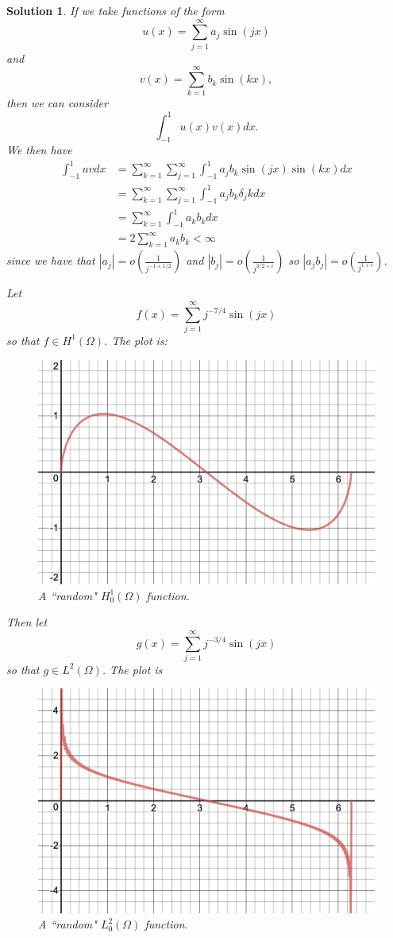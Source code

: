 \documentclass[leqno]{article}
\theoremstyle{nonumberplain}
\newtheorem{solution}{Solution}
\begin{document}
\begin{solution}
If we take functions of the form
\[
u(x) = \sum_{j=1}^\infty a_j \sin(jx)
\]
and
\[
v(x) = \sum_{k=1}^\infty b_k \sin(kx),
\]
then we can consider
\[
\int_{-1}^1 u(x)v(x)dx.
\]
We then have
\begin{align*}
    \int_{-1}^1 uv dx &= \sum_{k=1}^\infty \sum_{j=1}^\infty \int_{-1}^1 a_j b_k \sin(jx)\sin(kx)dx\\
    &= \sum_{k=1}^\infty \sum_{j=1}^\infty \int_{-1}^1a_jb_k \delta_jk dx\\
    &= \sum_{k=1}^\infty \int_{-1}^1 a_kb_k dx\\
    &= 2\sum_{k=1}^\infty a_kb_k<\infty
\end{align*}
since we have that $|a_j|=o\left(\frac{1}{j^{-1+1/2}}\right)$ and $|b_j|=o\left(\frac{1}{j^{3/2+\epsilon}}\right)$ so $|a_jb_j|=o\left(\frac{1}{j^{1+\epsilon}}\right)$.

Let
\[
f(x) = \sum_{j=1}^\infty j^{-7/4} \sin(jx)
\]
so that $f\in H^1(\Omega)$.  The plot is:
\begin{figure}[H]
    \centering
    \includegraphics[width=.7\textwidth]{h^1.png}
    \caption{A ``random" $H^1_0(\Omega)$ function.}
\end{figure}

Then let
\[
g(x) = \sum_{j=1}^\infty j^{-3/4} \sin(jx)
\]
so that $g\in L^2(\Omega)$.  The plot is
\begin{figure}[H]
    \centering
    \includegraphics[width=.7\textwidth]{L^2.png}
    \caption{A ``random" $L^2_0(\Omega)$ function.}
\end{figure}


\end{solution}
\end{document}

